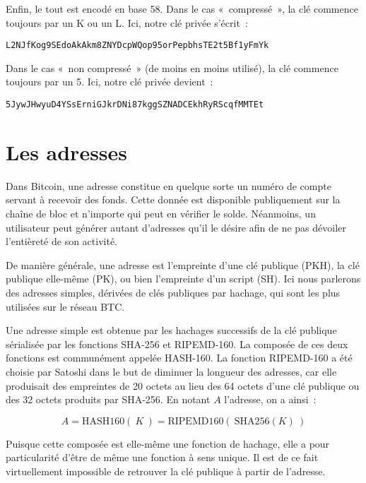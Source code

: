 Enfin, le tout est encodé en base 58. Dans le cas «~compressé~», la clé commence toujours par un K ou un L. Ici, notre clé privée s'écrit~:

\begin{Verbatim}[fontsize=\small]
L2NJfKog9SEdoAkAkm8ZNYDcpWQop95orPepbhsTE2t5Bf1yFmYk
\end{Verbatim}

Dans le cas «~non compressé~» (de moins en moins utilisé), la clé commence toujours par un 5. Ici, notre clé privée devient~:

\begin{Verbatim}[fontsize=\small]
5JywJHwyuD4YSsErniGJkrDNi87kggSZNADCEkhRyRScqfMMTEt
\end{Verbatim}

\section*{Les adresses}

Dans Bitcoin, une adresse constitue en quelque sorte un numéro de compte servant à recevoir des fonds. Cette donnée est disponible publiquement sur la chaîne de bloc et n'importe qui peut en vérifier le solde. Néanmoins, un utilisateur peut générer autant d'adresses qu'il le désire afin de ne pas dévoiler l'entièreté de son activité.

De manière générale, une adresse est l'empreinte d'une clé publique (PKH), la clé publique elle-même (PK), ou bien l'empreinte d'un script (SH). Ici nous parlerons des adresses simples, dérivées de clés publiques par hachage, qui sont les plus utilisées sur le réseau BTC.

Une adresse simple est obtenue par les hachages successifs de la clé publique sérialisée par les fonctions SHA-256 et RIPEMD-160. La composée de ces deux fonctions est communément appelée HASH-160. La fonction RIPEMD-160 a été choisie par Satoshi dans le but de diminuer la longueur des adresses, car elle produisait des empreintes de 20 octets au lieu des 64 octets d'une clé publique ou des 32 octets produits par SHA-256. En notant $A$ l'adresse, on a ainsi~:

{ \small
\[
A = \mathrm{HASH160}(~K~) = \mathrm{RIPEMD160}(~\mathrm{SHA256}( K )~)
\]
}

Puisque cette composée est elle-même une fonction de hachage, elle a pour particularité d'être de même une fonction à sens unique. Il est de ce fait virtuellement impossible de retrouver la clé publique à partir de l'adresse.

